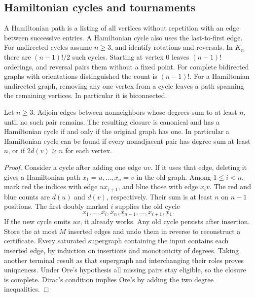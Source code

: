 \subsection{Hamiltonian cycles and tournaments}

A Hamiltonian path is a listing of all vertices without repetition with an edge between successive entries. A Hamiltonian cycle also uses the last-to-first edge. For undirected cycles assume $n\ge3$, and identify rotations and reversals. In $K_n$ there are $(n-1)!/2$ such cycles. Starting at vertex $0$ leaves $(n-1)!$ orderings, and reversal pairs them without a fixed point. For complete bidirected graphs with orientations distinguished the count is $(n-1)!$. For a Hamiltonian undirected graph, removing any one vertex from a cycle leaves a path spanning the remaining vertices. In particular it is biconnected.

\begin{theorem}\label{result21}\label{thm:graph-closure}
Let $n\ge3$. Adjoin edges between nonneighbors whose degrees sum to at least $n$, until no such pair remains. The resulting closure is canonical and has a Hamiltonian cycle if and only if the original graph has one. In particular a Hamiltonian cycle can be found if every nonadjacent pair has degree sum at least $n$, or if $2d(v)\ge n$ for each vertex.
\end{theorem}
\begin{proof}
Consider a cycle after adding one edge $uv$. If it uses that edge, deleting it gives a Hamiltonian path $x_1=u,\ldots,x_n=v$ in the old graph. Among $1\le i<n$, mark red the indices with edge $ux_{i+1}$, and blue those with edge $x_iv$. The red and blue counts are $d(u)$ and $d(v)$, respectively. Their sum is at least $n$ on $n-1$ positions. The first doubly marked $i$ supplies the old cycle
\[
 x_1,\ldots,x_i,x_n,x_{n-1},\ldots,x_{i+1},x_1 .
\]
If the new cycle omits $uv$, it already works. Any old cycle persists after insertion. Store the at most $M$ inserted edges and undo them in reverse to reconstruct a certificate. Every saturated supergraph containing the input contains each inserted edge, by induction on insertions and monotonicity of degrees. Taking another terminal result as that supergraph and interchanging their roles proves uniqueness. Under Ore's hypothesis all missing pairs stay eligible, so the closure is complete. Dirac's condition implies Ore's by adding the two degree inequalities.
\end{proof}


